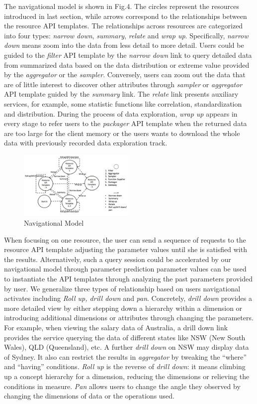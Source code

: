 \documentclass[10pt, conference, compsocconf]{IEEEtran}
\begin{document}
The navigational model is shown in Fig.4. The circles represent the resources introduced in last section, while arrows correspond to the relationships between the resource API templates. The relationships across resources are categorized into four types: \textit{narrow down}, \textit{summary}, \textit{relate} and \textit{wrap up}. Specifically, \textit{narrow down} means zoom into the data from less detail to more detail. Users could be guided to the \textit{filter} API template by the \textit{narrow down} link to query detailed data from summarized data based on the data distribution or extreme value provided by the \textit{aggregator} or the \textit{sampler}. Conversely, users can zoom out the data that are of little interest to discover other attributes through \textit{sampler} or \textit{aggregator} API template guided by the \textit{summary} link. The \textit{relate} link presents auxiliary services, for example, some statistic functions like correlation, standardization and distribution. During the process of data exploration, \textit{wrap up} appears in every stage to refer users to the \textit{packager} API template when the returned data are too large for the client memory or the users wants to download the whole data with previously recorded data exploration track.
\begin{figure}
	\centering
	\includegraphics[width=0.5\textwidth]{navigationalModel.pdf}
	\caption{Navigational Model}
	\label{fig.4}
\end{figure}
When focusing on one resource, the user can send a sequence of requests to the resource API template adjusting the parameter values until she is satisfied with the results. Alternatively, such a query session could be accelerated by our navigational model through parameter prediction  \textemdash  parameter values can be used to instantiate the API templates through analyzing the past parameters provided by user. We generalize three types of relationship based on users navigational activates including \textit{Roll up, drill down }and \textit{pan}. Concretely, \textit{drill down} provides a more detailed view by either stepping down a hierarchy within a dimension or introducing additional dimensions or attributes through changing the parameters. For example, when viewing the salary data of Australia, a drill down link provides the service querying the data of different states like NSW (New South Wales), QLD (Queensland), etc. A further \textit{drill down} on NSW may display data of Sydney. It also can restrict the results in \textit{aggregator} by tweaking the “where” and “having” conditions. \textit{Roll up} is the reverse of \textit{drill down}: it means climbing up a concept hierarchy for a dimension, reducing the dimensions or relieving the conditions in measure. \textit{Pan} allows users to change the angle they observed by changing the dimensions of data or the operations used.
\end{document}
